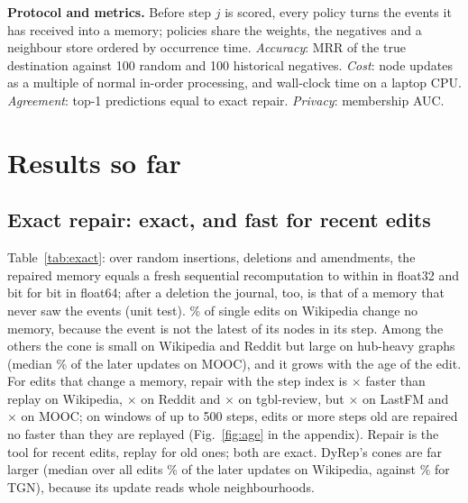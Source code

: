 \documentclass{article}
\begin{document}
\textbf{Protocol and metrics.} Before step $j$ is scored, every policy turns the events it has received into a memory;
policies share the weights, the negatives and a neighbour store ordered by occurrence time. \emph{Accuracy}: MRR of the true
destination against 100 random and 100 historical negatives. \emph{Cost}: node updates as a multiple of normal in-order
processing, and wall-clock time on a laptop CPU. \emph{Agreement}: top-1 predictions equal to exact repair.
\emph{Privacy}: membership AUC.

\section{Results so far}
\label{sec:results}

\subsection{Exact repair: exact, and fast for recent edits}
\label{sec:exact}



Table~\ref{tab:exact}: over \ExTotalAll{} random insertions, deletions and amendments, the repaired memory equals a fresh
sequential recomputation to within \ExMaxAll{} in float32 and bit for bit in float64; after a deletion the journal, too, is
that of a memory that never saw the events (unit test). \ExNoEffectWiki\% of single edits on Wikipedia change no memory, because
the event is not the latest of its nodes in its step. Among the others the cone is small on Wikipedia and Reddit but large
on hub-heavy graphs (median \ExConeEffMooc\% of the later updates on MOOC), and it grows with the age of the edit. For edits
that change a memory, repair with the step index is \BenchSpeedEffWiki$\times$ faster than replay on Wikipedia,
\BenchSpeedEffReddit$\times$ on Reddit and \BenchSpeedEffReview$\times$ on tgbl-review, but \BenchSpeedEffLastfm$\times$ on
LastFM and \BenchSpeedEffMooc$\times$ on MOOC; on windows of up to 500 steps, edits \AgeOldSteps{} or more steps old are
repaired no faster than they are replayed (Fig.~\ref{fig:age} in the appendix). Repair is the tool for recent edits, replay
for old ones; both are exact. DyRep's cones are far larger (median over all edits \DyrepConeWiki\% of the later updates on
Wikipedia, against \ExConeWiki\% for TGN), because its update reads whole neighbourhoods.
\end{document}
